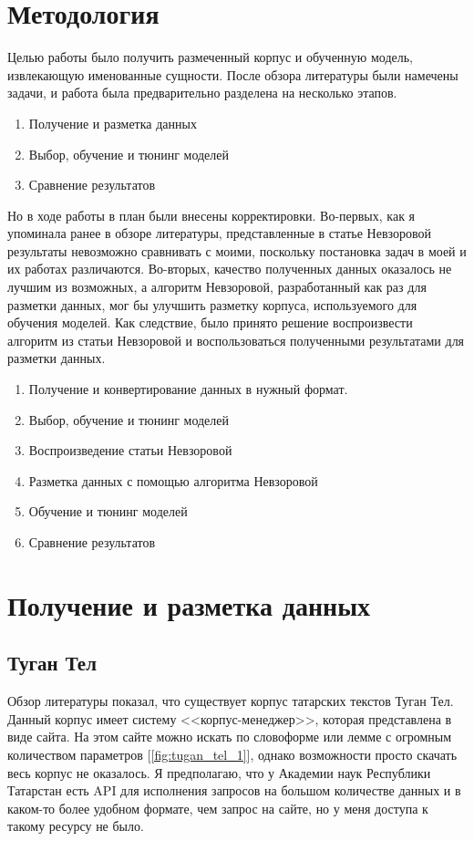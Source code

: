 \section{Методология}

Целью работы было получить размеченный корпус и обученную модель, извлекающую именованные сущности. После обзора литературы были намечены задачи, и работа была предварительно разделена на несколько этапов.

\begin{enumerate}
\item Получение и разметка данных
\item Выбор, обучение и тюнинг моделей
\item Сравнение результатов
\end{enumerate}

Но в ходе работы в план были внесены корректировки. Во-первых, как я упоминала ранее в обзоре литературы, представленные в статье Невзоровой результаты невозможно сравнивать с моими, поскольку постановка задач в моей и их работах различаются. Во-вторых, качество полученных данных оказалось не лучшим из возможных, а алгоритм Невзоровой, разработанный как раз для разметки данных, мог бы улучшить разметку корпуса, используемого для обучения моделей. Как следствие, было принято решение воспроизвести алгоритм из статьи Невзоровой и воспользоваться полученными результатами для разметки данных.

\begin{enumerate}
\item Получение и конвертирование данных в нужный формат.
\item Выбор, обучение и тюнинг моделей
\item Воспроизведение статьи Невзоровой
\item Разметка данных с помощью алгоритма Невзоровой
\item Обучение и тюнинг моделей
\item Сравнение результатов
\end{enumerate}


\section{Получение и разметка данных}

\subsection{Туган Тел}

Обзор литературы показал, что существует корпус татарских текстов Туган Тел\cite{tugan_tel}. Данный корпус имеет систему <<корпус-менеджер>>, которая представлена в виде сайта. На этом сайте можно искать по словоформе или лемме с огромным количеством параметров [\ref{fig:tugan_tel_1}], однако возможности просто скачать весь корпус не оказалось. Я предполагаю, что у Академии наук Республики Татарстан есть API для исполнения запросов на большом количестве данных и в каком-то более удобном формате, чем запрос на сайте, но у меня доступа к такому ресурсу не было.

